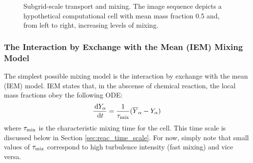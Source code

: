 \begin{figure}
\begin{center}
\end{center}
\caption{Subgrid-scale transport and mixing. The image sequence depicts a hypothetical computational cell with mean mass fraction 0.5 and, from left to right, increasing levels of mixing.}
\label{fig_transport_vs_mixing}
\end{figure}

\subsubsection{The Interaction by Exchange with the Mean (IEM) Mixing Model}

The simplest possible mixing model is the interaction by exchange with the mean (IEM) model.  IEM states that, in the abscense of chemical reaction, the local mass fractions obey the following ODE:
\begin{equation}\label{eq:iem}
\frac{\,\mathrm{d} Y_\alpha}{\,\mathrm{d} t} = \frac{1}{\tau_{\rm mix}}(\overline{Y}_\alpha - Y_\alpha)
\end{equation}
where $\tau_{\rm mix}$ is the characteristic mixing time for the cell.  This time scale is discussed below in Section \ref{sec:reac_time_scale}.  For now, simply note that small values of $\tau_{\rm mix}$ correspond to high turbulence intensity (fast mixing) and vice versa.

